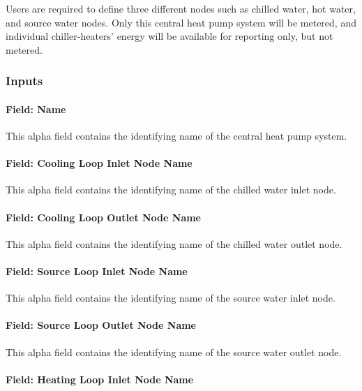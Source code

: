 Users are required to define three different nodes such as chilled water, hot water, and source water nodes. Only this central heat pump system will be metered, and individual chiller-heaters' energy will be available for reporting only, but not metered.

\subsubsection{Inputs}\label{inputs-19-004}

\paragraph{Field: Name}\label{field-name-18-005}

This alpha field contains the identifying name of the central heat pump system.

\paragraph{Field: Cooling Loop Inlet Node Name}\label{field-cooling-loop-inlet-node-name}

This alpha field contains the identifying name of the chilled water inlet node.

\paragraph{Field: Cooling Loop Outlet Node Name}\label{field-cooling-loop-outlet-node-name}

This alpha field contains the identifying name of the chilled water outlet node.

\paragraph{Field: Source Loop Inlet Node Name}\label{field-source-loop-inlet-node-name}

This alpha field contains the identifying name of the source water inlet node.

\paragraph{Field: Source Loop Outlet Node Name}\label{field-source-loop-outlet-node-name}

This alpha field contains the identifying name of the source water outlet node.

\paragraph{Field: Heating Loop Inlet Node Name}\label{field-heating-loop-inlet-node-name}

